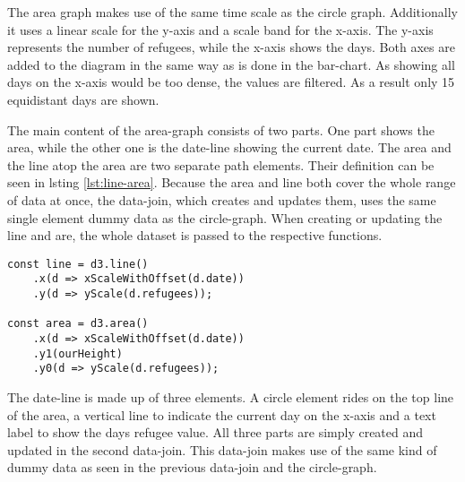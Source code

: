 The area graph makes use of the same time scale as the circle graph. Additionally it uses a linear scale for the y-axis and a scale band for the x-axis. The y-axis represents the number of refugees, while the x-axis shows the days. Both axes are added to the diagram in the same way as is done in the bar-chart. As showing all days on the x-axis would be too dense, the values are filtered. As a result only 15 equidistant days are shown.

The main content of the area-graph consists of two parts. One part shows the area, while the other one is the date-line showing the current date. The area and the line atop the area are two separate path elements. Their definition can be seen in lsting \ref{lst:line-area}. Because the area and line both cover the whole range of data at once, the data-join, which creates and updates them, uses the same single element dummy data as the circle-graph. When creating or updating the line and are, the whole dataset is passed to the respective functions.

\begin{minipage}{\linewidth}
    \begin{lstlisting}[style=htmlcssjs, captionpos=b, caption={The first constant defines the function for creating the top-line of the area graph. Therefore the functions for x and y values are defined. When the function is called and a data-set is provided, by calling \texttt{line(data)}, the line is constructed by calculating the according x and y positions for every data-point. Defining and creating the area works in similar fashion. Yet there are two y-positions for each x-position. This allows for a huge variety of shapes. Yet it is not possible to create concave ends on the right or left side of the diagram, assuming left and rigth are aligned with the orientation of the x-axis.}, label={lst:line-area}]
const line = d3.line()
    .x(d => xScaleWithOffset(d.date))
    .y(d => yScale(d.refugees));

const area = d3.area()
    .x(d => xScaleWithOffset(d.date))
    .y1(ourHeight)
    .y0(d => yScale(d.refugees));
    \end{lstlisting}
\end{minipage}

The date-line is made up of three elements. A circle element rides on the top line of the area, a vertical line to indicate the current day on the x-axis and a text label to show the days refugee value. All three parts are simply created and updated in the second data-join. This data-join makes use of the same kind of dummy data as seen in the previous data-join and the circle-graph.


